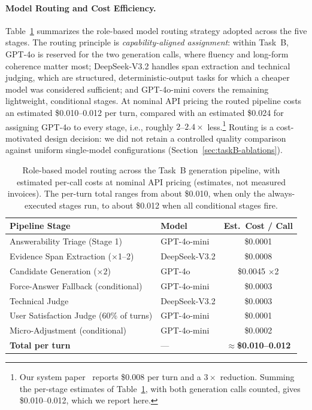 \paragraph{Model Routing and Cost Efficiency.}
\label{sec:model-routing}
Table~\ref{tab:routing-en} summarizes the role-based model routing strategy adopted across the five stages. The routing principle is \emph{capability-aligned assignment}: within Task~B, GPT-4o is reserved for the two generation calls, where fluency and long-form coherence matter most; DeepSeek-V3.2 handles span extraction and technical judging, which are structured, deterministic-output tasks for which a cheaper model was considered sufficient; and GPT-4o-mini covers the remaining lightweight, conditional stages. At nominal API pricing the routed pipeline costs an estimated \$0.010--0.012 per turn, compared with an estimated \$0.024 for assigning GPT-4o to every stage, i.e., roughly $2$--$2.4\times$ less.\footnote{Our system paper~\citep{athanasiou2026ailsntua} reports \$0.008 per turn and a $3\times$ reduction. Summing the per-stage estimates of Table~\ref{tab:routing-en}, with both generation calls counted, gives \$0.010--0.012, which we report here.} Routing is a cost-motivated design decision: we did not retain a controlled quality comparison against uniform single-model configurations (Section~\ref{sec:taskB-ablations}).

\begin{table}[h]
\centering
\small
\begin{tabular}{llc}
\toprule
\textbf{Pipeline Stage} & \textbf{Model} & \textbf{Est.\ Cost / Call} \\
\midrule
Answerability Triage (Stage 1) & GPT-4o-mini & \$0.0001 \\
Evidence Span Extraction ($\times$1--2) & DeepSeek-V3.2 & \$0.0008 \\
Candidate Generation ($\times 2$) & GPT-4o & \$0.0045 $\times$2 \\
Force-Answer Fallback (conditional) & GPT-4o-mini & \$0.0003 \\
Technical Judge & DeepSeek-V3.2 & \$0.0003 \\
User Satisfaction Judge ($60\%$ of turns) & GPT-4o-mini & \$0.0001 \\
Micro-Adjustment (conditional) & GPT-4o-mini & \$0.0002 \\
\midrule
\textbf{Total per turn} & --- & \textbf{$\approx$\$0.010--0.012} \\
\bottomrule
\end{tabular}
\caption{Role-based model routing across the Task~B generation pipeline, with estimated per-call costs at nominal API pricing (estimates, not measured invoices). The per-turn total ranges from about \$0.010, when only the always-executed stages run, to about \$0.012 when all conditional stages fire.}
\label{tab:routing-en}
\end{table}
